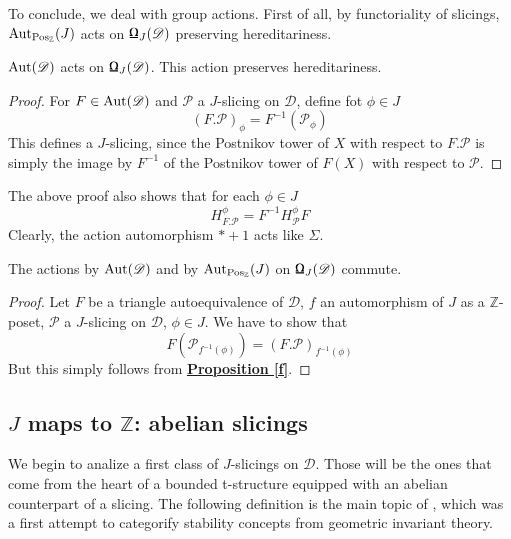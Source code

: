 To conclude, we deal with group actions. First of all, by functoriality of slicings, $\textnormal{Aut}_{\textnormal{Pos}_{\mathbb{Z}}}(J)$ acts on $\textnormal{\Libra}_J(\mathscr{D})$ preserving hereditariness. 

\begin{prop}
$\textnormal{Aut}(\mathscr{D})$ acts on $\textnormal{\Libra}_J(\mathscr{D})$. This action preserves hereditariness. 
\end{prop}

\begin{proof}
For $F \in \textnormal{Aut}(\mathscr{D})$ and $\mathscr{P}$ a $J$-slicing on $\mathscr{D}$, define fot $\phi \in J$ $$(F.\mathscr{P})_{\phi}=F^{-1}(\mathscr{P}_{\phi})$$
This defines a $J$-slicing, since the Postnikov tower of $X$ with respect to $F.\mathscr{P}$ is simply the image by $F^{-1}$ of the Postnikov tower of $F(X)$ with respect to $\mathscr{P}$. 
\end{proof}

The above proof also shows that for each $\phi \in J$ $$H^{\phi}_{F.\mathscr{P}}=F^{-1} H^{\phi}_{\mathscr{P}}F$$
Clearly, the action automorphism $*+1$ acts like $\Sigma$. 

\begin{prop}
The actions by $\textnormal{Aut}(\mathscr{D})$ and by $\textnormal{Aut}_{\textnormal{Pos}_{\mathbb{Z}}}(J)$ on $\textnormal{\Libra}_J(\mathscr{D})$ commute. 
\end{prop}

\begin{proof}
Let $F$ be a triangle autoequivalence of $\mathscr{D}$, $f$ an automorphism of $J$ as a $\mathbb{Z}$-poset, $\mathscr{P}$ a $J$-slicing on $\mathscr{D}$, $\phi \in J$. We have to show that  $$F(\mathscr{P}_{f^{-1}(\phi)})=(F.\mathscr{P})_{f^{-1}(\phi)}$$
But this simply follows from \hyperref[f]{\textbf{Proposition \ref*{f}}}.
\end{proof} 

\newpage 
\subsection{$J$ maps to $\mathbb{Z}$: abelian slicings}
We begin to analize a first class of $J$-slicings on $\mathscr{D}$. Those will be the ones that come from the heart of a bounded t-structure equipped with an abelian counterpart of a slicing. The following definition is the main topic of \cite{rud}, which was a first attempt to categorify stability concepts from geometric invariant theory. \\ 


